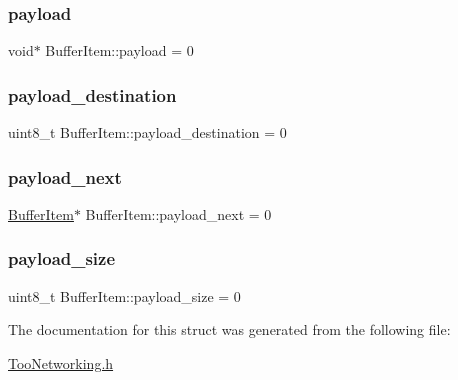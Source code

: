 \subsubsection{\texorpdfstring{payload}{payload}}
{\footnotesize\ttfamily void$\ast$ Buffer\+Item\+::payload = 0}

\mbox{\label{structBufferItem_a2e475a18a6671f1f0c4bf3010d7a6e89}} 
\subsubsection{\texorpdfstring{payload\+\_\+destination}{payload\_destination}}
{\footnotesize\ttfamily uint8\+\_\+t Buffer\+Item\+::payload\+\_\+destination = 0}

\mbox{\label{structBufferItem_ab20f3ae7cc41c118265557f2c7e2c4f0}} 
\subsubsection{\texorpdfstring{payload\+\_\+next}{payload\_next}}
{\footnotesize\ttfamily \hyperlink{structBufferItem}{Buffer\+Item}$\ast$ Buffer\+Item\+::payload\+\_\+next = 0}

\mbox{\label{structBufferItem_a5c3187c383ceec1825964d5e512273de}} 
\subsubsection{\texorpdfstring{payload\+\_\+size}{payload\_size}}
{\footnotesize\ttfamily uint8\+\_\+t Buffer\+Item\+::payload\+\_\+size = 0}



The documentation for this struct was generated from the following file\+:\begin{DoxyCompactItemize}
\item 
\hyperlink{TooNetworking_8h}{Too\+Networking.\+h}\end{DoxyCompactItemize}
